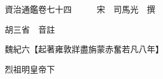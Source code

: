










 


 
 


 

  
  
  
  
  





  
  
  
  
  
 
  

  

  
  
  



  

 
 

  
   




  

  
  


  　　資治通鑑卷七十四　　　宋　司馬光　撰

　　胡三省　音註

　　魏紀六【起著雍敦牂盡旃蒙赤奮若凡八年】

　　烈祖明皇帝下

